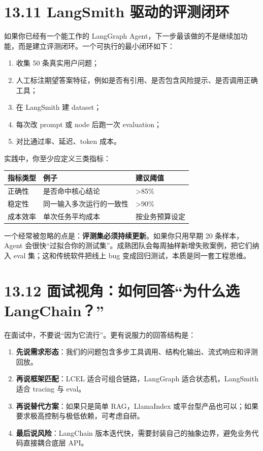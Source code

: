 \section{13.11 LangSmith 驱动的评测闭环}

如果你已经有一个能工作的 LangGraph Agent，下一步最该做的不是继续加功能，而是建立评测闭环。一个可执行的最小闭环如下：


\begin{enumerate}[leftmargin=2em]
\item 收集 50 条真实用户问题；
\item 人工标注期望答案特征，例如是否有引用、是否包含风险提示、是否调用正确工具；
\item 在 LangSmith 建 dataset；
\item 每次改 prompt 或 node 后跑一次 evaluation；
\item 对比通过率、延迟、token 成本。
\end{enumerate}

实践中，你至少应定义三类指标：


\begingroup
\scriptsize
\setlength{\tabcolsep}{3pt}
\begin{longtable}{|p{}|p{}|p{}|}
\hline
指标类型 & 例子 & 建议阈值 \\ \hline
正确性 & 是否命中核心结论 & >85\% \\ \hline
稳定性 & 同一输入多次运行的一致性 & >90\% \\ \hline
成本效率 & 单次任务平均成本 & 按业务预算设定 \\ \hline
\end{longtable}
\endgroup

一个经常被忽略的点是：\textbf{评测集必须持续更新}。如果你只用早期 20 条样本，Agent 会很快``过拟合你的测试集''。成熟团队会每周抽样新增失败案例，把它们纳入 eval 集；这和传统软件把线上 bug 变成回归测试，本质是同一套工程思维。


\section{13.12 面试视角：如何回答``为什么选 LangChain？''}

在面试中，不要说``因为它流行''。更有说服力的回答结构是：


\begin{enumerate}[leftmargin=2em]
\item \textbf{先说需求形态}：我们的问题包含多步工具调用、结构化输出、流式响应和评测回放。
\item \textbf{再说框架匹配}：LCEL 适合可组合链路，LangGraph 适合状态机，LangSmith 适合 tracing 与 eval。
\item \textbf{再说替代方案}：如果只是简单 RAG，LlamaIndex 或平台型产品也可以；如果要求极高控制与极低依赖，可考虑自研。
\item \textbf{最后说风险}：LangChain 版本迭代快，需要封装自己的抽象边界，避免业务代码直接耦合底层 API。
\end{enumerate}

